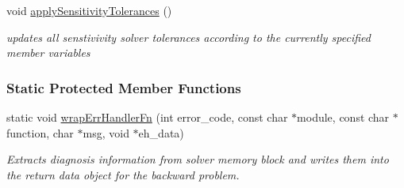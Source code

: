 \begin{DoxyCompactItemize}
\mbox{\label{classamici_1_1_solver_a2d93ff630e5bb38f4bc6d8b47b46bd73}} 
void \mbox{\hyperlink{classamici_1_1_solver_a2d93ff630e5bb38f4bc6d8b47b46bd73}{apply\+Sensitivity\+Tolerances}} ()
\begin{DoxyCompactList}\small\item\em updates all senstivivity solver tolerances according to the currently specified member variables \end{DoxyCompactList}\end{DoxyCompactItemize}
\subsubsection*{Static Protected Member Functions}
\begin{DoxyCompactItemize}
\item 
static void \mbox{\hyperlink{classamici_1_1_solver_a0040ff50d302fddc63a175cbb773d21e}{wrap\+Err\+Handler\+Fn}} (int error\+\_\+code, const char $\ast$module, const char $\ast$function, char $\ast$msg, void $\ast$eh\+\_\+data)
\begin{DoxyCompactList}\small\item\em Extracts diagnosis information from solver memory block and writes them into the return data object for the backward problem. \end{DoxyCompactList}\end{DoxyCompactItemize}
